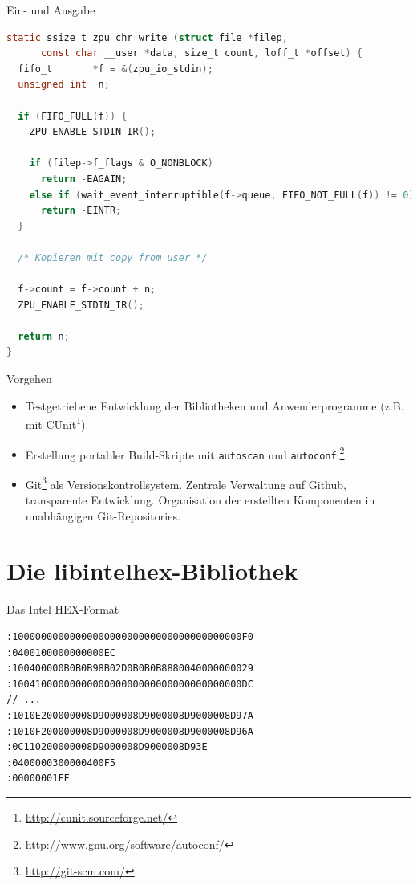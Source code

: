 \documentclass[10pt]{beamer}
\begin{document}
	\begin{frame}[fragile]{Ein- und Ausgabe}
	\begin{lstlisting}[language=C,basicstyle=\footnotesize\ttfamily]
	static ssize_t zpu_chr_write (struct file *filep,
	  const char __user *data, size_t count, loff_t *offset) {
  fifo_t       *f = &(zpu_io_stdin);
  unsigned int  n;

  if (FIFO_FULL(f)) {
    ZPU_ENABLE_STDIN_IR();

    if (filep->f_flags & O_NONBLOCK)
      return -EAGAIN;
    else if (wait_event_interruptible(f->queue, FIFO_NOT_FULL(f)) != 0)
      return -EINTR;
  }

  /* Kopieren mit copy_from_user */

  f->count = f->count + n;
  ZPU_ENABLE_STDIN_IR();

  return n;
}
	\end{lstlisting}
	\end{frame}
	
	\begin{frame}{Vorgehen}
		\begin{itemize}
			\item Testgetriebene Entwicklung der Bibliotheken und Anwenderprogramme (z.B. mit CUnit\footnote{\url{http://cunit.sourceforge.net/}})
			\item Erstellung portabler Build-Skripte mit \texttt{autoscan} und \texttt{autoconf}.\footnote{\url{http://www.gnu.org/software/autoconf/}}
			\item Git\footnote{\url{http://git-scm.com/}} als Versionskontrollsystem. Zentrale Verwaltung auf Github, transparente Entwicklung. Organisation der erstellten Komponenten in unabhängigen Git-Repositories.
		\end{itemize}
	\end{frame}
	
	\section{Die libintelhex-Bibliothek}
	
	\begin{frame}[fragile]{Das Intel HEX-Format}
		\begin{lstlisting}[frame=single]
			:1000000000000000000000000000000000000000F0
:0400100000000000EC
:100400000B0B0B98B02D0B0B0B8880040000000029
:1004100000000000000000000000000000000000DC
// ...
:1010E200000008D9000008D9000008D9000008D97A
:1010F200000008D9000008D9000008D9000008D96A
:0C110200000008D9000008D9000008D93E
:0400000300000400F5
:00000001FF
		\end{lstlisting}
	\end{frame}
	
\end{document}
